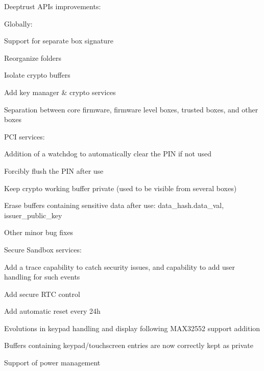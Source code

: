 Deeptrust A\+PI\textquotesingle{}s improvements\+:

Globally\+:
\begin{DoxyItemize}
\item Support for separate box signature
\item Reorganize folders
\item Isolate crypto buffers
\item Add key manager \& crypto services
\item Separation between core firmware, firmware level boxes, trusted boxes, and other boxes
\end{DoxyItemize}

P\+CI services\+:
\begin{DoxyItemize}
\item Addition of a watchdog to automatically clear the P\+IN if not used
\item Forcibly flush the P\+IN after use
\item Keep crypto working buffer private (used to be visible from several boxes)
\item Erase buffers containing sensitive data after use\+: data\+\_\+hash.\+data\+\_\+val, issuer\+\_\+public\+\_\+key
\item Other minor bug fixes
\end{DoxyItemize}

Secure Sandbox services\+:
\begin{DoxyItemize}
\item Add a trace capability to catch security issues, and capability to add user handling for such events
\item Add secure R\+TC control
\item Add automatic reset every 24h
\item Evolutions in keypad handling and display following M\+A\+X32552 support addition
\item Buffers containing keypad/touchscreen entries are now correctly kept as private
\item Support of power management
\end{DoxyItemize}